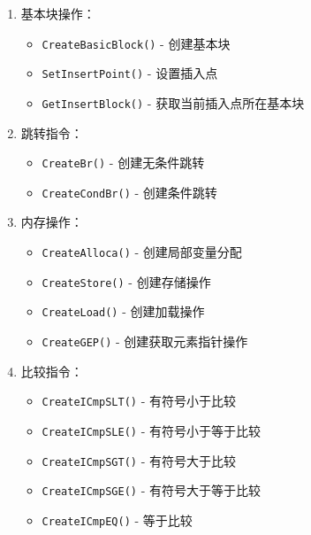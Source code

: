 \documentclass[../main.tex]{subfiles}
\begin{document}
\begin{enumerate}
	      \begin{enumerate}
		      \item 基本块操作：
		            \begin{itemize}
			            \item \texttt{CreateBasicBlock()} - 创建基本块
			            \item \texttt{SetInsertPoint()} - 设置插入点
			            \item \texttt{GetInsertBlock()} - 获取当前插入点所在基本块
		            \end{itemize}

		      \item 跳转指令：
		            \begin{itemize}
			            \item \texttt{CreateBr()} - 创建无条件跳转
			            \item \texttt{CreateCondBr()} - 创建条件跳转
		            \end{itemize}

		      \item 内存操作：
		            \begin{itemize}
			            \item \texttt{CreateAlloca()} - 创建局部变量分配
			            \item \texttt{CreateStore()} - 创建存储操作
			            \item \texttt{CreateLoad()} - 创建加载操作
			            \item \texttt{CreateGEP()} - 创建获取元素指针操作
		            \end{itemize}

		      \item 比较指令：
		            \begin{itemize}
			            \item \texttt{CreateICmpSLT()} - 有符号小于比较
			            \item \texttt{CreateICmpSLE()} - 有符号小于等于比较
			            \item \texttt{CreateICmpSGT()} - 有符号大于比较
			            \item \texttt{CreateICmpSGE()} - 有符号大于等于比较
			            \item \texttt{CreateICmpEQ()} - 等于比较
		            \end{itemize}


\end{enumerate}
\end{enumerate}
\end{document}

